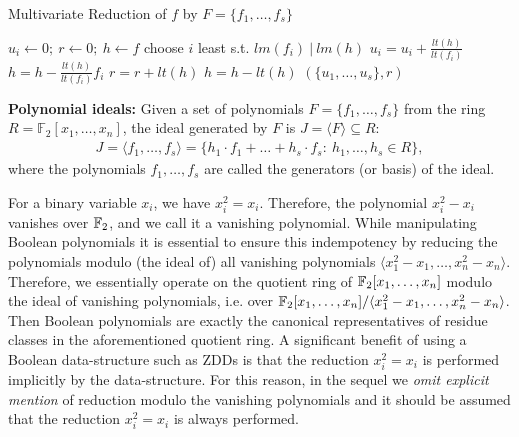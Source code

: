 \begin{algorithm}[H]
 \caption{Multivariate Reduction of $f$ by $F=\{f_1,\dots,f_s\}$}
 \label{algo:mv_reduce}
 \begin{algorithmic}[1]
 \State $u_i \gets 0; ~r \gets 0; ~h \gets f $ 
 \State choose $i$ least s.t. $lm(f_i) ~|~ lm(h)$
 \State $u_i = u_i + \frac{lt(h)}{lt(f_i)}$
 \State $h = h - \frac{lt(h)}{lt(f_i)} f_i$
 \Else
 \State $r = r+ lt(h)$
 \State $h = h - lt(h)$
 \EndIf
 \EndWhile
 \State \Return $(\{u_1,\dots,u_s\} , r)$
 \EndProcedure
 \end{algorithmic}
 \end{algorithm}


{\bf Polynomial ideals:} Given a set of polynomials $F = \{f_1, \dots,
f_s\}$ from the ring $R = \mathbb{F}_2[x_1,\dots, x_n]$, the ideal 
generated by $F$ is $J = \langle F\rangle \subseteq R$:
\begin{align}
J = \langle f_1, \dots, f_s \rangle =
\{h_1\cdot f_1+\dots+h_s\cdot f_s: ~h_1,\dots,h_s \in R\},
\end{align}
where the polynomials $f_1,\dots,f_s$ are called the generators (or
basis) of the ideal. 


For a binary variable $x_i$, we have $x_i^2 = x_i$. Therefore, the
polynomial $x_i^2 - x_i$ vanishes over ${\mathbb{F}}_{2}$, and we call it a
vanishing polynomial. While manipulating Boolean polynomials it is
essential to ensure this indempotency by reducing the polynomials
modulo (the ideal of) all vanishing polynomials $\langle
x_1^2-x_1,\dots,x_n^2-x_n\rangle$. Therefore, %
we essentially operate on the quotient ring of ${\mathbb{F}}_{2}[x_1,\dots,x_n]$
modulo the ideal of vanishing polynomials, i.e. %
over ${\mathbb{F}}_{2}[x_1,\dots,x_n]/\langle x_1^2-x_1,\dots,x_n^2-x_n\rangle$. 
Then Boolean polynomials are exactly the canonical representatives of
residue classes in the aforementioned quotient ring. A significant
benefit of using a Boolean data-structure such as ZDDs is that the
reduction $x_i^2 = x_i$ is performed implicitly by the
data-structure. 
For this reason, in the sequel we {\it omit explicit mention} of
reduction modulo the vanishing polynomials 
and it should be assumed that the reduction $x_i^2 = x_i$
is always performed. 

